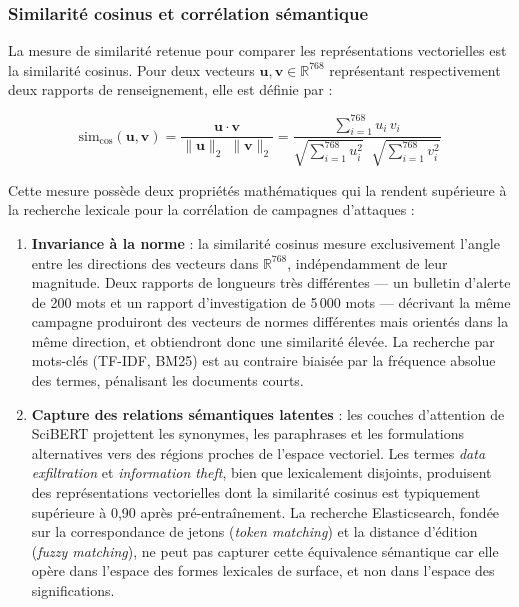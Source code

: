 \subsubsection{Similarité cosinus et corrélation sémantique}

La mesure de similarité retenue pour comparer les représentations vectorielles est la similarité cosinus. Pour deux vecteurs $\mathbf{u}, \mathbf{v} \in \mathbb{R}^{768}$ représentant respectivement deux rapports de renseignement, elle est définie par :

\begin{equation}
\label{eq:cosine-sim}
\text{sim}_{\cos}(\mathbf{u}, \mathbf{v}) = \frac{\mathbf{u} \cdot \mathbf{v}}{\|\mathbf{u}\|_2 \; \|\mathbf{v}\|_2} = \frac{\displaystyle\sum_{i=1}^{768} u_i \, v_i}{\sqrt{\displaystyle\sum_{i=1}^{768} u_i^2} \;\; \sqrt{\displaystyle\sum_{i=1}^{768} v_i^2}}
\end{equation}

Cette mesure possède deux propriétés mathématiques qui la rendent supérieure à la recherche lexicale pour la corrélation de campagnes d'attaques :

\begin{enumerate}
    \item \textbf{Invariance à la norme} : la similarité cosinus mesure exclusivement l'angle entre les directions des vecteurs dans $\mathbb{R}^{768}$, indépendamment de leur magnitude. Deux rapports de longueurs très différentes --- un bulletin d'alerte de 200 mots et un rapport d'investigation de 5\,000 mots --- décrivant la même campagne produiront des vecteurs de normes différentes mais orientés dans la même direction, et obtiendront donc une similarité élevée. La recherche par mots-clés (TF-IDF, BM25) est au contraire biaisée par la fréquence absolue des termes, pénalisant les documents courts.
    \item \textbf{Capture des relations sémantiques latentes} : les couches d'attention de SciBERT projettent les synonymes, les paraphrases et les formulations alternatives vers des régions proches de l'espace vectoriel. Les termes \textit{data exfiltration} et \textit{information theft}, bien que lexicalement disjoints, produisent des représentations vectorielles dont la similarité cosinus est typiquement supérieure à 0{,}90 après pré-entraînement. La recherche Elasticsearch, fondée sur la correspondance de jetons (\textit{token matching}) et la distance d'édition (\textit{fuzzy matching}), ne peut pas capturer cette équivalence sémantique car elle opère dans l'espace des formes lexicales de surface, et non dans l'espace des significations.
\end{enumerate}

